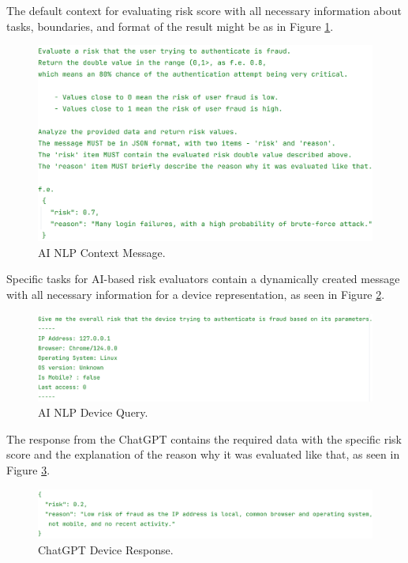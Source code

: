 \newpage

The default context for evaluating risk score with all necessary information about tasks, boundaries, and format of the result might be as in Figure \ref{fig:impl-ai-context-message}.

\begin{figure}[htbp]
  \centering
  \includegraphics[width=1\textwidth]{img/sections/6-implementation/aiContextMessage.png}
  \caption{AI NLP Context Message.}
  \label{fig:impl-ai-context-message}
\end{figure}

Specific tasks for AI-based risk evaluators contain a dynamically created message with all necessary information for a device representation, as seen in Figure \ref{fig:impl-ai-device-message}. 

\begin{figure}[htbp]
  \centering
  \includegraphics[width=1\textwidth]{img/sections/6-implementation/aiDeviceUserMessage.png}
  \caption{AI NLP Device Query.}
  \label{fig:impl-ai-device-message}
\end{figure}

\newpage

The response from the ChatGPT contains the required data with the specific risk score and the explanation of the reason why it was evaluated like that, as seen in Figure \ref{fig:impl-ai-device-message-response}.

\begin{figure}[htbp]
  \centering
  \includegraphics[width=1\textwidth]{img/sections/6-implementation/aiDeviceResponse.png}
  \caption{ChatGPT Device Response.}
  \label{fig:impl-ai-device-message-response}
\end{figure}

